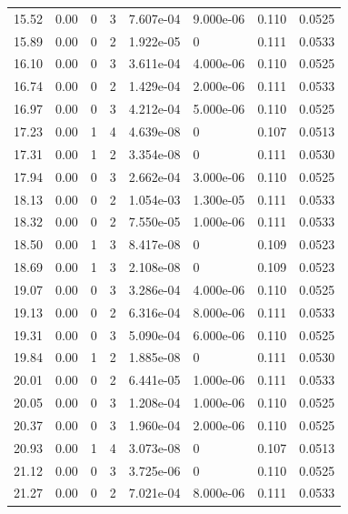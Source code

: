 \documentclass[preview]{standalone}
\begin{document}
{{{\begin{tabular}{L{1.2cm}C{1.2cm} C{0.3cm}C{0.5cm} C{1.4cm}C{1.4cm} C{1.4cm}C{1.4cm}}
  15.52  &  0.00  & 0     &  3 &  7.607e-04  & 9.000e-06  & 0.110 &  0.0525   \\ 
  15.89  &  0.00  & 0     &  2 &  1.922e-05  & 0  & 0.111 &  0.0533   \\ 
  16.10  &  0.00  & 0     &  3 &  3.611e-04  & 4.000e-06  & 0.110 &  0.0525   \\ 
  16.74  &  0.00  & 0     &  2 &  1.429e-04  & 2.000e-06  & 0.111 &  0.0533   \\ 
  16.97  &  0.00  & 0     &  3 &  4.212e-04  & 5.000e-06  & 0.110 &  0.0525   \\ 
  17.23  &  0.00  & 1     &  4 &  4.639e-08  & 0  & 0.107 &  0.0513   \\ 
  17.31  &  0.00  & 1     &  2 &  3.354e-08  & 0  & 0.111 &  0.0530   \\ 
  17.94  &  0.00  & 0     &  3 &  2.662e-04  & 3.000e-06  & 0.110 &  0.0525   \\ 
  18.13  &  0.00  & 0     &  2 &  1.054e-03  & 1.300e-05  & 0.111 &  0.0533   \\ 
  18.32  &  0.00  & 0     &  2 &  7.550e-05  & 1.000e-06  & 0.111 &  0.0533   \\ 
  18.50  &  0.00  & 1     &  3 &  8.417e-08  & 0  & 0.109 &  0.0523   \\ 
  18.69  &  0.00  & 1     &  3 &  2.108e-08  & 0  & 0.109 &  0.0523   \\ 
  19.07  &  0.00  & 0     &  3 &  3.286e-04  & 4.000e-06  & 0.110 &  0.0525   \\ 
  19.13  &  0.00  & 0     &  2 &  6.316e-04  & 8.000e-06  & 0.111 &  0.0533   \\ 
  19.31  &  0.00  & 0     &  3 &  5.090e-04  & 6.000e-06  & 0.110 &  0.0525   \\ 
  19.84  &  0.00  & 1     &  2 &  1.885e-08  & 0  & 0.111 &  0.0530   \\ 
  20.01  &  0.00  & 0     &  2 &  6.441e-05  & 1.000e-06  & 0.111 &  0.0533   \\ 
  20.05  &  0.00  & 0     &  3 &  1.208e-04  & 1.000e-06  & 0.110 &  0.0525   \\ 
  20.37  &  0.00  & 0     &  3 &  1.960e-04  & 2.000e-06  & 0.110 &  0.0525   \\ 
  20.93  &  0.00  & 1     &  4 &  3.073e-08  & 0  & 0.107 &  0.0513   \\ 
  21.12  &  0.00  & 0     &  3 &  3.725e-06  & 0  & 0.110 &  0.0525   \\ 
  21.27  &  0.00  & 0     &  2 &  7.021e-04  & 8.000e-06  & 0.111 &  0.0533   \\ 

\end{tabular}}}}
\end{document}
